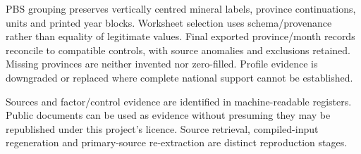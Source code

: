 PBS grouping preserves vertically centred mineral labels, province continuations, units and printed year blocks. Worksheet selection uses schema/provenance rather than equality of legitimate values. Final exported province/month records reconcile to compatible controls, with source anomalies and exclusions retained. Missing provinces are neither invented nor zero-filled. Profile evidence is downgraded or replaced where complete national support cannot be established.

Sources and factor/control evidence are identified in machine-readable registers. Public documents can be used as evidence without presuming they may be republished under this project's licence. Source retrieval, compiled-input regeneration and primary-source re-extraction are distinct reproduction stages.
